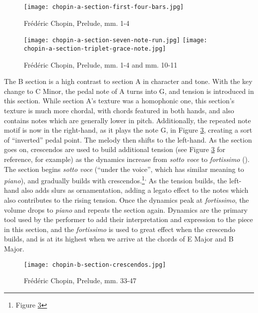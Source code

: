 \begin{figure}[h]
  \centering
  \texttt{[image: chopin-a-section-first-four-bars.jpg]}
  \caption{Frédéric Chopin, Prelude, mm. 1-4}
  \label{fig:chopin-a-section-first-four-bars}
\end{figure}

\begin{figure}[h]
  \centering
  \texttt{[image: chopin-a-section-seven-note-run.jpg]}
  \texttt{[image: chopin-a-section-triplet-grace-note.jpg]}
  \caption{Frédéric Chopin, Prelude, mm. 1-4 and mm. 10-11}
  \label{fig:chopin-a-section-examples-ornamentation}
\end{figure}

The B section is a high contrast to section A in character and tone. With the key change to C\musSharp{} Minor, the pedal note of A\musFlat{} turns into G\musSharp{}, and tension is introduced in this section. While section A's texture was a homophonic one, this section's texture is much more chordal, with chords featured in both hands, and also contains notes which are generally lower in pitch. Additionally, the repeated note motif is now in the right-hand, as it plays the note G\musSharp{}, in Figure \ref{fig:chopin-b-section-crescendos}\autocite{Hansen_1973}, creating a sort of ``inverted'' pedal point. The melody then shifts to the left-hand. As the section goes on, crescendos are used to build additional tension (see Figure \ref{fig:chopin-b-section-crescendos}\autocite{Hansen_1973} for reference, for example) as the dynamics increase from \textit{sotto voce} to \textit{fortissimo} (). The section begins \textit{sotto voce} (``under the voice'', which has similar meaning to \textit{piano}), and gradually builds with crescendos.\footnote{Figure \ref{fig:chopin-b-section-crescendos}}\textsuperscript{,}\autocite{Hansen_1973} As the tension builds, the left-hand also adds slurs as ornamentation, adding a legato effect to the notes which also contributes to the rising tension. Once the dynamics peak at \textit{fortissimo}, the volume drops to \textit{piano} and repeats the section again. Dynamics are the primary tool used by the performer to add their interpretation and expression to the piece in this section, and the \textit{fortissimo} is used to great effect when the crescendo builds, and is at its highest when we arrive at the chords of E Major and B Major.

\begin{figure}[h]
  \centering
  \texttt{[image: chopin-b-section-crescendos.jpg]}
  \caption{Frédéric Chopin, Prelude, mm. 33-47}
  \label{fig:chopin-b-section-crescendos}
\end{figure}

